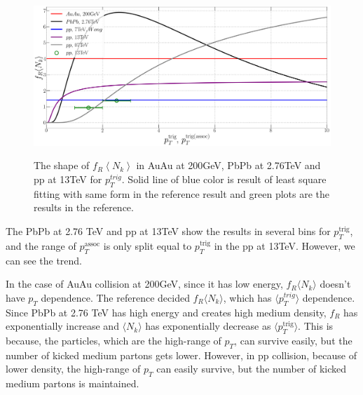 \documentclass[jkps,fleqn,showpacs,showkeys]{revtex4}
\begin{document}


\begin{figure}[ht]
\centering
\includegraphics[width=12cm, height=6cm]{./Figures/Paper_frnk}
\caption{The shape of $f_R \left\langle N_k \right\rangle$ in AuAu at 200GeV, PbPb at 2.76TeV and pp at 13TeV for $p_{T}^{trig}$.
Solid line of blue color is result of least square fitting with same form in the reference\cite{PbPb} result and green plots are the results in the reference\cite{Hanul}.}
\label{figure:frnk}
\end{figure}

The PbPb at 2.76 TeV and pp at 13TeV show the results in several bins for $p_T^{\text{trig}}$, and the range of $p_T^{\text{assoc}}$ is only split equal to $p_T^{\text{trig}}$ in the pp at 13TeV. However, we can see the trend.


In the case of AuAu collision at 200GeV, since it has low energy, $f_R \langle N_k \rangle$ doesn't have $p_T$ dependence.
The reference\cite{PbPb} decided  $f_R \langle N_k \rangle$, which has $\langle p_T^{trig} \rangle$ dependence. Since PbPb at 2.76 TeV has high energy and creates high medium density, $f_R$ has exponentially increase and $\langle N_k \rangle$ has exponentially decrease as $\langle p_T^{\text{trig}} \rangle$. This is because, the particles, which are the high-range of $p_T$, can survive easily, but the number of kicked medium partons gets lower.
However, in pp collision, because of lower density, the high-range of $p_T$ can easily survive, but the number of kicked medium partons is maintained.
\end{document}
